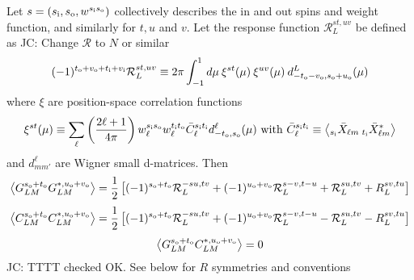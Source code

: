 \documentclass[reprint,prd, superscriptaddress, tightenlines, longbibliography, nofootinbib, eqsecnum, amsfonts, amsmath, floatfix, notitlepage, onecolumn]{revtex4-1}
\newcommand{\si}[0]{{s_{\rm i}}}
\newcommand{\ti}[0]{{t_{\rm i}}}
\newcommand{\vi}[0]{{v_{\rm i}}}
\newcommand{\so}[0]{{s_{\rm o}}}
\renewcommand{\to}[0]{{t_{\rm o}}}
\newcommand{\uo}[0]{{u_{\rm o}}}
\newcommand{\vo}[0]{{v_{\rm o}}}
\newcommand{\av}[1]{\left\langle #1 \right\rangle}
\newcommand{\JC}[1]{\color{red}JC: #1\color{black}}
\begin{document}
Let $s = (\si, \so, w^{\si\so})$ collectively describes the in and out spins and weight function, and similarly for $t, u$ and $v$. Let the response function $\mathcal R^{st, uv}_L$ be defined as \JC{Change $\mathcal R $ to $N$ or similar}
\begin{equation}
(-1)^{\to + \vo + \ti + \vi} \mathcal R_L^{st,uv} \equiv 2\pi  \int_{-1}^1 d \mu \:\xi^{st}(\mu)\:\xi^{uv}(\mu)\: d^L_{-\to - \vo, \so + \uo}(\mu) 
\end{equation}
where $\xi$ are position-space correlation functions
\begin{equation}
\xi^{st}(\mu) \equiv  \sum_\ell \left(\frac{2\ell + 1}{4\pi}\right)w^{\si\so}_\ell w^{\ti\to}_\ell \bar C_\ell^{\si \ti} d^\ell_{-\to,\so}(\mu)\textrm{ with } \bar C_\ell^{\si \ti} \equiv \av{ _{\si}\bar X_{\ell m}\: _{\ti} \bar X^*_{\ell m} }
\end{equation}
and $d^\ell_{mm'}$ are Wigner small d-matrices.
Then
\begin{equation}
	\av{G^{\so + \to}_{LM} G^{*, \uo + \vo}_{L M} } = \frac 12\left[ (-1)^{\so + \to} \mathcal R^{-su, tv}_L + (-1)^{\uo + \vo} \mathcal R_L^{s-v, t-u}+\mathcal R^{su, tv}_L  + R^{sv, tu}_L \right]
\end{equation}
\begin{equation}
	\av{C^{\so + \to}_{LM} C^{*, \uo + \vo}_{L M} } = \frac 12\left[ (-1)^{\so + \to} \mathcal R^{-su, tv}_L + (-1)^{\uo + \vo} \mathcal R_L^{s-v, t-u}-\mathcal R^{su, tv}_L  - R^{sv, tu}_L \right]
\end{equation}
\begin{equation}
	\av{G^{\so + \to}_{LM} C^{*, \uo + \vo}_{L M} } =0
\end{equation}
\JC{TTTT checked OK. See below for $R$ symmetries and conventions}
\end{document}

